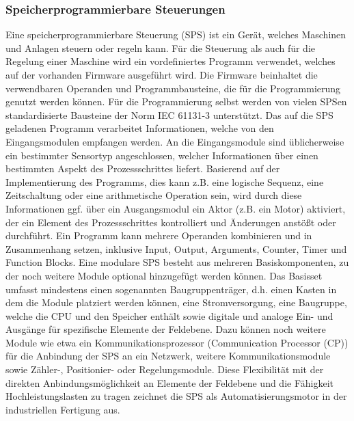 \subsubsection{Speicherprogrammierbare Steuerungen}
Eine speicherprogrammierbare Steuerung (SPS) ist ein Gerät, welches Maschinen und Anlagen steuern oder regeln kann. Für die Steuerung als auch für die Regelung einer Maschine wird ein vordefiniertes Programm verwendet, welches auf der vorhanden Firmware ausgeführt wird. Die Firmware beinhaltet die verwendbaren Operanden und Programmbausteine, die für die Programmierung genutzt werden können. Für die Programmierung selbst werden von vielen SPSen standardisierte Bausteine der Norm IEC 61131-3 unterstützt.
Das auf die SPS geladenen Programm verarbeitet Informationen, welche von den Eingangsmodulen empfangen werden. An die Eingangsmodule sind üblicherweise ein bestimmter Sensortyp angeschlossen, welcher Informationen über einen bestimmten Aspekt des Prozessschrittes liefert. Basierend auf der Implementierung des Programms, dies kann z.B. eine logische Sequenz, eine Zeitschaltung oder eine arithmetische Operation sein, wird durch diese Informationen ggf. über ein Ausgangsmodul ein Aktor (z.B. ein Motor) aktiviert, der ein Element des Prozessschrittes kontrolliert und Änderungen anstößt oder durchführt. Ein Programm kann mehrere Operanden kombinieren und in Zusammenhang setzen, inklusive Input, Output, Arguments, Counter, Timer und Function Blocks.
Eine modulare SPS besteht aus mehreren Basiskomponenten, zu der noch weitere Module optional hinzugefügt werden können. Das Basisset umfasst mindestens einen sogenannten Baugruppenträger, d.h. einen Kasten in dem die Module platziert werden können, eine Stromversorgung, eine Baugruppe, welche die CPU und den Speicher enthält sowie digitale und analoge Ein- und Ausgänge für spezifische Elemente der Feldebene. 
Dazu können noch weitere Module wie etwa ein Kommunikationsprozessor (Communication Processor (CP)) 
für die Anbindung der SPS an ein Netzwerk, weitere Kommunikationsmodule sowie Zähler-, Positionier- oder Regelungsmodule. 
Diese Flexibilität mit der direkten Anbindungsmöglichkeit an Elemente der Feldebene und die Fähigkeit Hochleistungslasten zu tragen zeichnet die SPS als Automatisierungsmotor in der industriellen Fertigung aus.

